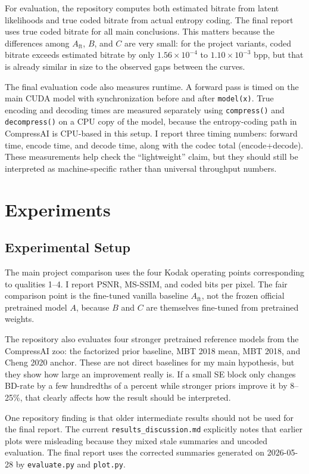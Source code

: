 \documentclass[10pt]{article}
\begin{document}
For evaluation, the repository computes both estimated bitrate from latent likelihoods and true coded bitrate from actual entropy coding. The final report uses true coded bitrate for all main conclusions. This matters because the differences among \(A_{\mathrm{ft}}\), \(B\), and \(C\) are very small: for the project variants, coded bitrate exceeds estimated bitrate by only \(1.56\times 10^{-4}\) to \(1.10\times 10^{-3}\) bpp, but that is already similar in size to the observed gaps between the curves.

The final evaluation code also measures runtime. A forward pass is timed on the main CUDA model with synchronization before and after \texttt{model(x)}. True encoding and decoding times are measured separately using \texttt{compress()} and \texttt{decompress()} on a CPU copy of the model, because the entropy-coding path in CompressAI is CPU-based in this setup. I report three timing numbers: forward time, encode time, and decode time, along with the codec total (encode+decode). These measurements help check the ``lightweight'' claim, but they should still be interpreted as machine-specific rather than universal throughput numbers.

\section{Experiments}
\subsection{Experimental Setup}
The main project comparison uses the four Kodak operating points corresponding to qualities 1--4. I report PSNR, MS-SSIM, and coded bits per pixel. The fair comparison point is the fine-tuned vanilla baseline \(A_{\mathrm{ft}}\), not the frozen official pretrained model \(A\), because \(B\) and \(C\) are themselves fine-tuned from pretrained weights.

The repository also evaluates four stronger pretrained reference models from the CompressAI zoo: the factorized prior baseline, MBT 2018 mean, MBT 2018, and Cheng 2020 anchor. These are not direct baselines for my main hypothesis, but they show how large an improvement really is. If a small SE block only changes BD-rate by a few hundredths of a percent while stronger priors improve it by 8--25\%, that clearly affects how the result should be interpreted.

One repository finding is that older intermediate results should not be used for the final report. The current \texttt{results\_discussion.md} explicitly notes that earlier plots were misleading because they mixed stale summaries and uncoded evaluation. The final report uses the corrected summaries generated on 2026-05-28 by \texttt{evaluate.py} and \texttt{plot.py}.
\end{document}
